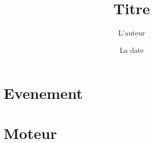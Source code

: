 \documentclass{report}
\title{Titre}
\author{L'auteur}
\date{La date}
\begin{document}
\maketitle
\tableofcontents
\newpage

\section{Evenement}
\section{Moteur}

 
\end{document}
